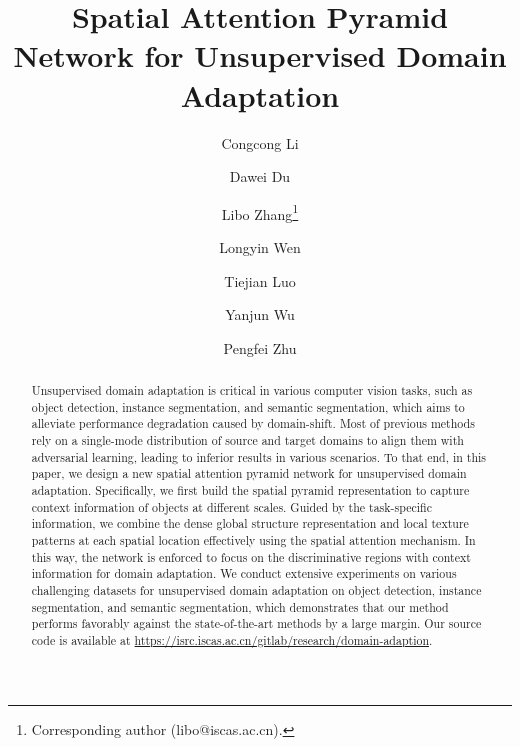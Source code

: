 \documentclass[runningheads]{llncs}
\begin{document}
\pagestyle{headings}
\mainmatter
\def\ECCVSubNumber{1951}  

\title{Spatial Attention Pyramid Network for Unsupervised Domain Adaptation} 


\newcommand*\samethanks[1][\value{footnote}]{\footnotemark[#1]}
\author{Congcong Li\and
Dawei Du\and
Libo Zhang\thanks{Corresponding author (libo@iscas.ac.cn).}\and
Longyin Wen\and
Tiejian Luo\samethanks\and
Yanjun Wu\and
Pengfei Zhu}

\maketitle

\begin{abstract}
Unsupervised domain adaptation is critical in various computer vision tasks, such as object detection, instance segmentation, and semantic segmentation, which aims to alleviate performance degradation caused by domain-shift. Most of previous methods rely on a single-mode distribution of source and target domains to align them with adversarial learning, leading to inferior results in various scenarios. To that end, in this paper, we design a new spatial attention pyramid network for unsupervised domain adaptation. Specifically, we first build the spatial pyramid representation to capture context information of objects at different scales. Guided by the task-specific information, we combine the dense global structure representation and local texture patterns at each spatial location effectively using the spatial attention mechanism. In this way, the network is enforced to focus on the discriminative regions with context information for domain adaptation. We conduct extensive experiments on various challenging datasets for unsupervised domain adaptation on object detection, instance segmentation, and semantic segmentation, which demonstrates that our method performs favorably against the state-of-the-art methods by a large margin. Our source code is available at \url{https://isrc.iscas.ac.cn/gitlab/research/domain-adaption}.
\end{abstract}
\end{document}
